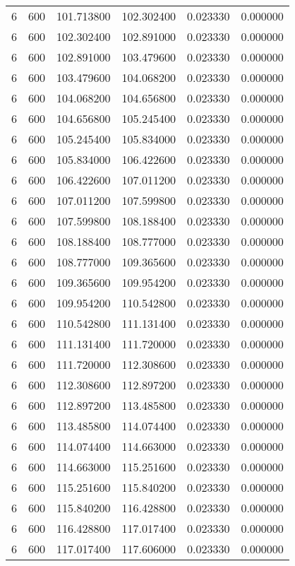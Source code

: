 \begin{longtable}{rrrrrr}
6 & 600 & 101.713800 & 102.302400 & 0.023330 & 0.000000 \\
6 & 600 & 102.302400 & 102.891000 & 0.023330 & 0.000000 \\
6 & 600 & 102.891000 & 103.479600 & 0.023330 & 0.000000 \\
6 & 600 & 103.479600 & 104.068200 & 0.023330 & 0.000000 \\
6 & 600 & 104.068200 & 104.656800 & 0.023330 & 0.000000 \\
6 & 600 & 104.656800 & 105.245400 & 0.023330 & 0.000000 \\
6 & 600 & 105.245400 & 105.834000 & 0.023330 & 0.000000 \\
6 & 600 & 105.834000 & 106.422600 & 0.023330 & 0.000000 \\
6 & 600 & 106.422600 & 107.011200 & 0.023330 & 0.000000 \\
6 & 600 & 107.011200 & 107.599800 & 0.023330 & 0.000000 \\
6 & 600 & 107.599800 & 108.188400 & 0.023330 & 0.000000 \\
6 & 600 & 108.188400 & 108.777000 & 0.023330 & 0.000000 \\
6 & 600 & 108.777000 & 109.365600 & 0.023330 & 0.000000 \\
6 & 600 & 109.365600 & 109.954200 & 0.023330 & 0.000000 \\
6 & 600 & 109.954200 & 110.542800 & 0.023330 & 0.000000 \\
6 & 600 & 110.542800 & 111.131400 & 0.023330 & 0.000000 \\
6 & 600 & 111.131400 & 111.720000 & 0.023330 & 0.000000 \\
6 & 600 & 111.720000 & 112.308600 & 0.023330 & 0.000000 \\
6 & 600 & 112.308600 & 112.897200 & 0.023330 & 0.000000 \\
6 & 600 & 112.897200 & 113.485800 & 0.023330 & 0.000000 \\
6 & 600 & 113.485800 & 114.074400 & 0.023330 & 0.000000 \\
6 & 600 & 114.074400 & 114.663000 & 0.023330 & 0.000000 \\
6 & 600 & 114.663000 & 115.251600 & 0.023330 & 0.000000 \\
6 & 600 & 115.251600 & 115.840200 & 0.023330 & 0.000000 \\
6 & 600 & 115.840200 & 116.428800 & 0.023330 & 0.000000 \\
6 & 600 & 116.428800 & 117.017400 & 0.023330 & 0.000000 \\
6 & 600 & 117.017400 & 117.606000 & 0.023330 & 0.000000 \\

\end{longtable}
